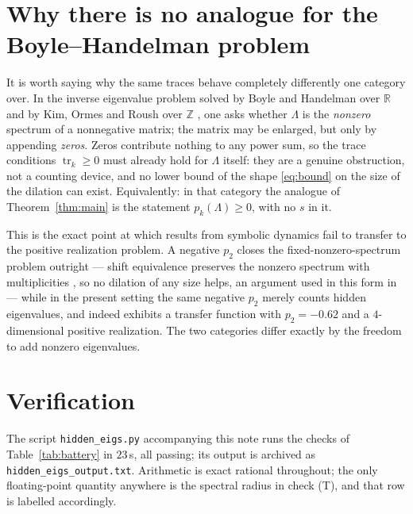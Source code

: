 \documentclass[11pt]{article}
\theoremstyle{plain}
\theoremstyle{remark}
\newcommand{\Z}{\mathbb{Z}}
\newcommand{\R}{\mathbb{R}}
\begin{document}
\section{Why there is no analogue for the Boyle--Handelman problem}\label{sec:bh}

It is worth saying why the same traces behave completely differently one category over.
In the inverse eigenvalue problem solved by Boyle and Handelman over $\R$ \cite{BH91} and by
Kim, Ormes and Roush over $\Z$ \cite{KOR00}, one asks whether $\Lambda$ is the \emph{nonzero}
spectrum of a nonnegative matrix; the matrix may be enlarged, but only by appending
\emph{zeros}. Zeros contribute nothing to any power sum, so the trace conditions
$\operatorname{tr}_k\ge0$ must already hold for $\Lambda$ itself: they are a genuine
obstruction, not a counting device, and no lower bound of the shape \eqref{eq:bound} on the
size of the dilation can exist. Equivalently: in that category the analogue of
Theorem~\ref{thm:main} is the statement $p_k(\Lambda)\ge0$, with no $s$ in it.

This is the exact point at which results from symbolic dynamics fail to transfer to the
positive realization problem. A negative $p_2$ closes the fixed-nonzero-spectrum problem
outright --- shift equivalence preserves the nonzero spectrum with multiplicities
\cite[\S7.4]{LM95}, so no dilation of any size helps, an argument used in this form in
\cite[II]{ANCFT} --- while in the present setting the same negative $p_2$ merely counts
hidden eigenvalues, and indeed \cite[Ex.~8]{BF04} exhibits a transfer function with
$p_2=-0.62$ and a $4$-dimensional positive realization. The two categories differ exactly by
the freedom to add nonzero eigenvalues.

\section{Verification}\label{sec:battery}

The script \texttt{hidden\_eigs.py} accompanying this note runs the checks of
Table~\ref{tab:battery} in $23$\,s, all passing; its output is archived as
\texttt{hidden\_eigs\_output.txt}. Arithmetic is exact rational throughout; the only
floating-point quantity anywhere is the spectral radius in check (T), and that row is
labelled accordingly.
\end{document}
